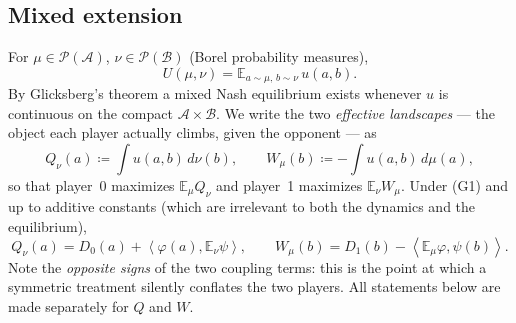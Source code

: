 \documentclass[11pt]{article}
\theoremstyle{definition}
\newcommand{\E}{\mathbb{E}}
\newcommand{\cA}{\mathcal{A}}
\newcommand{\cB}{\mathcal{B}}
\newcommand{\cP}{\mathcal{P}}
\newcommand{\ip}[2]{\left\langle #1, #2 \right\rangle}
\begin{document}
\subsection{Mixed extension}
For $\mu \in \cP(\cA)$, $\nu \in \cP(\cB)$ (Borel probability measures),
\begin{equation}\label{eq:mixed}
  U(\mu, \nu) = \E_{a \sim \mu,\, b \sim \nu}\, u(a,b) .
\end{equation}
By Glicksberg's theorem a mixed Nash equilibrium exists whenever $u$ is
continuous on the compact $\cA \times \cB$. We write the two \emph{effective
landscapes} --- the object each player actually climbs, given the opponent ---
as
\begin{equation}\label{eq:effective}
  Q_\nu(a) \coloneqq \int u(a,b)\, d\nu(b), \qquad
  W_\mu(b) \coloneqq -\int u(a,b)\, d\mu(a),
\end{equation}
so that player~0 maximizes $\E_\mu Q_\nu$ and player~1 maximizes
$\E_\nu W_\mu$. Under (G1) and up to additive constants (which are irrelevant
to both the dynamics and the equilibrium),
\begin{equation}\label{eq:effective-G1}
  Q_\nu(a) = D_0(a) + \ip{\varphi(a)}{\E_\nu \psi}, \qquad
  W_\mu(b) = D_1(b) - \ip{\E_\mu \varphi}{\psi(b)} .
\end{equation}
Note the \emph{opposite signs} of the two coupling terms: this is the point at
which a symmetric treatment silently conflates the two players. All statements
below are made separately for $Q$ and $W$.
\end{document}
